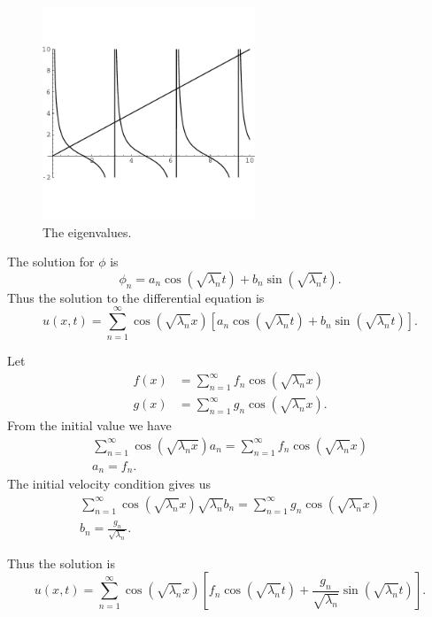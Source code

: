\begin{figure}[h!]
  \begin{center}
    \includegraphics[height=2.5in]{pde/separation/cot}
  \end{center}
  \caption{The eigenvalues.}
  \label{cot}
\end{figure}



The solution for $\phi$ is
\[ \phi_n = a_n \cos(\sqrt{\lambda_n} t) + b_n \sin(\sqrt{\lambda_n} t). \]
Thus the solution to the differential equation is
\[ u(x,t) = \sum_{n=1}^\infty \cos(\sqrt{\lambda_n} x) [a_n \cos(\sqrt{\lambda_n}t)
+ b_n \sin(\sqrt{\lambda_n} t)]. \]

Let
\begin{align*}
  f(x) &= \sum_{n=1}^\infty f_n \cos(\sqrt{\lambda_n} x) \\
  g(x) &= \sum_{n=1}^\infty g_n \cos(\sqrt{\lambda_n} x).
\end{align*}
From the initial value we have
\begin{gather*}
  \sum_{n=1}^\infty \cos(\sqrt{\lambda_n x})a_n = \sum_{n=1}^\infty f_n \cos(\sqrt{\lambda_n}x)\\
  a_n = f_n.
\end{gather*}
The initial velocity condition gives us
\begin{gather*}
  \sum_{n=1}^\infty \cos(\sqrt{\lambda_n} x) \sqrt{\lambda_n} b_n =
  \sum_{n=1}^\infty g_n \cos(\sqrt{\lambda_n}x) \\
  b_n = \frac{g_n}{\sqrt{\lambda_n}}.
\end{gather*}

Thus the solution is
\[ \boxed{ u(x,t) = \sum_{n=1}^\infty \cos(\sqrt{\lambda_n}x)
  \left[f_n \cos(\sqrt{\lambda_n}t) + \frac{g_n}{\sqrt{\lambda_n}}
    \sin(\sqrt{\lambda_n}t)\right]. } \]






